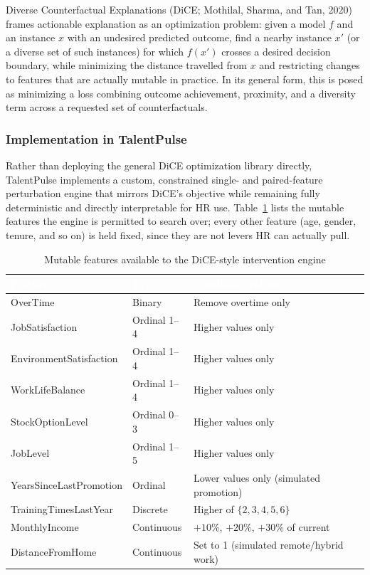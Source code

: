 \documentclass[11pt,a4paper]{article}
\newcommand{\hdrow}{\rowcolor{TPnavy}}
\newcommand{\hdtxt}[1]{\textcolor{white}{\bfseries #1}}
\begin{document}
Diverse Counterfactual Explanations (DiCE; Mothilal, Sharma, and Tan, 2020) frames actionable explanation as an optimization problem: given a model $f$ and an instance $x$ with an undesired predicted outcome, find a nearby instance $x'$ (or a diverse set of such instances) for which $f(x')$ crosses a desired decision boundary, while minimizing the distance travelled from $x$ and restricting changes to features that are actually mutable in practice. In its general form, this is posed as minimizing a loss combining outcome achievement, proximity, and a diversity term across a requested set of counterfactuals.

\subsubsection{Implementation in TalentPulse}

Rather than deploying the general DiCE optimization library directly, TalentPulse implements a custom, constrained single- and paired-feature perturbation engine that mirrors DiCE's objective while remaining fully deterministic and directly interpretable for HR use. Table~\ref{tab:mod3-mutable} lists the mutable features the engine is permitted to search over; every other feature (age, gender, tenure, and so on) is held fixed, since they are not levers HR can actually pull.

\begin{table}[H]
\centering
\caption{Mutable features available to the DiCE-style intervention engine}
\label{tab:mod3-mutable}
\small
\begin{tabular}{p{3.6cm}p{2.6cm}p{7.2cm}}
\toprule
\hdrow \hdtxt{Feature} & \hdtxt{Type} & \hdtxt{Candidate values} \\
\midrule
OverTime & Binary & Remove overtime only \\
\rowcolor{TPlight}
JobSatisfaction & Ordinal 1--4 & Higher values only \\
EnvironmentSatisfaction & Ordinal 1--4 & Higher values only \\
\rowcolor{TPlight}
WorkLifeBalance & Ordinal 1--4 & Higher values only \\
StockOptionLevel & Ordinal 0--3 & Higher values only \\
\rowcolor{TPlight}
JobLevel & Ordinal 1--5 & Higher values only \\
YearsSinceLastPromotion & Ordinal & Lower values only (simulated promotion) \\
\rowcolor{TPlight}
TrainingTimesLastYear & Discrete & Higher of $\{2,3,4,5,6\}$ \\
MonthlyIncome & Continuous & $+10\%$, $+20\%$, $+30\%$ of current \\
\rowcolor{TPlight}
DistanceFromHome & Continuous & Set to 1 (simulated remote/hybrid work) \\
\bottomrule
\end{tabular}
\end{table}
\end{document}
